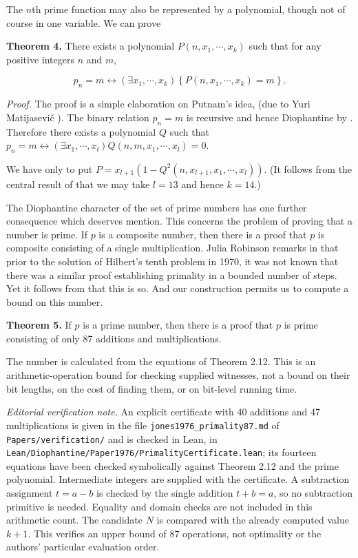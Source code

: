 \documentclass[10pt,letterpaper]{article}
\newcommand{\origpage}[1]{\marginnote{\footnotesize\textbf{[#1]}}}
\newcommand{\statement}[1]{\par\medskip\noindent\textbf{#1}\enspace}
\begin{document}
The $n$th prime function may also be represented by a polynomial, though not of course in one variable. We can prove

\statement{Theorem 4.} There exists a polynomial $P\left(n, x_{1}, \cdots, x_{k}\right)$ such that for any positive integers $n$ and $m$,

\[
p_{n}=m \leftrightarrow\left(\exists x_{1}, \cdots, x_{k}\right)\left\{P\left(n, x_{1}, \cdots, x_{k}\right)=m\right\} .
\]

\textit{Proof.} \origpage{451}The proof is a simple elaboration on Putnam's idea, (due to Yuri Matijasevič \cite{ref9}). The binary relation $p_{n}=m$ is recursive and hence Diophantine by \cite{ref4} \cite{ref8}. Therefore there exists a polynomial $Q$ such that $p_{n}=m \leftrightarrow\left(\exists x_{1}, \cdots, x_{l}\right) Q\left(n, m, x_{1}, \cdots, x_{l}\right)=0$.

We have only to put $P=x_{l+1}\left(1-Q^{2}\left(n, x_{l+1}, x_{1}, \cdots, x_{l}\right)\right)$. (It follows from the central result of \cite{ref11} that we may take $l=13$ and hence $k=14$.)

The Diophantine character of the set of prime numbers has one further consequence which deserves mention. This concerns the problem of proving that a number is prime. If $p$ is a composite number, then there is a proof that $p$ is composite consisting of a single multiplication. Julia Robinson remarks in \cite{ref14} that prior to the solution of Hilbert's tenth problem in 1970, it was not known that there was a similar proof establishing primality in a bounded number of steps. Yet it follows from \cite{ref4} \cite{ref8} that this is so. And our construction permits us to compute a bound on this number.

\statement{Theorem 5.} If $p$ is a prime number, then there is a proof that $p$ is prime consisting of only 87 additions and multiplications.

The number is calculated from the equations of Theorem 2.12. This is an arithmetic-operation bound for checking supplied witnesses, not a bound on their bit lengths, on the cost of finding them, or on bit-level running time.

\noindent\textit{Editorial verification note.} An explicit certificate with 40 additions and 47 multiplications is given in the file \texttt{jones1976\_primality87.md} of \texttt{Papers/}\allowbreak\texttt{verification/} and is checked in Lean, in \texttt{Lean/}\allowbreak\texttt{Diophantine/}\allowbreak\texttt{Paper1976/}\allowbreak\texttt{PrimalityCertificate.lean}; its fourteen equations have been checked symbolically against Theorem 2.12 and the prime polynomial. Intermediate integers are supplied with the certificate. A subtraction assignment $t=a-b$ is checked by the single addition $t+b=a$, so no subtraction primitive is needed. Equality and domain checks are not included in this arithmetic count. The candidate $N$ is compared with the already computed value $k+1$. This verifies an upper bound of 87 operations, not optimality or the authors' particular evaluation order.
\end{document}
